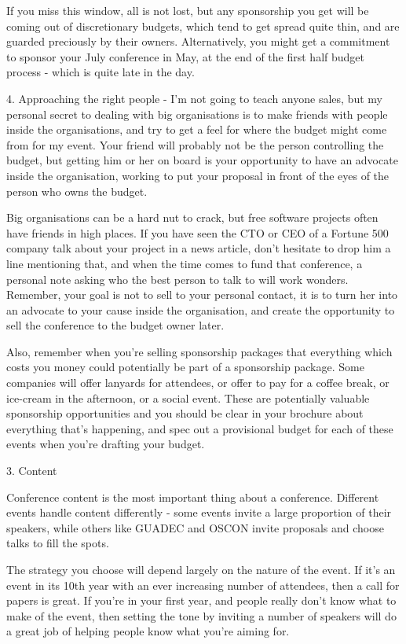               If you miss this window, all is not lost, but any sponsorship you get
will be coming out of discretionary budgets, which tend to get spread
quite thin, and are guarded preciously by their owners. Alternatively,
you might get a commitment to sponsor your July conference in May, at
the end of the first half budget process - which is quite late in the day.

               4. Approaching the right people - I'm not going to teach anyone sales,
but my personal secret to dealing with big organisations is to make
friends with people inside the organisations, and try to get a feel for
where the budget might come from for my event. Your friend will probably
not be the person controlling the budget, but getting him or her on
board is your opportunity to have an advocate inside the organisation,
working to put your proposal in front of the eyes of the person who owns
the budget.

               Big organisations can be a hard nut to crack, but free software
projects often have friends in high places. If you have seen the CTO or
CEO of a Fortune 500 company talk about your project in a news article,
don't hesitate to drop him a line mentioning that, and when the time
comes to fund that conference, a personal note asking who the best
person to talk to will work wonders. Remember, your goal is not to sell
to your personal contact, it is to turn her into an advocate to your
cause inside the organisation, and create the opportunity to sell the
conference to the budget owner later.

       Also, remember when you're selling sponsorship packages that everything
which costs you money could potentially be part of a sponsorship
package. Some companies will offer lanyards for attendees, or offer to
pay for a coffee break, or ice-cream in the afternoon, or a social
event. These are potentially valuable sponsorship opportunities and you
should be clear in your brochure about everything that's happening, and
spec out a provisional budget for each of these events when you're
drafting your budget.

3. Content

Conference content is the most important thing about a conference.
Different events handle content differently - some events invite a large
proportion of their speakers, while others like GUADEC and OSCON invite
proposals and choose talks to fill the spots.

The strategy you choose will depend largely on the nature of the event.
If it's an event in its 10th year with an ever increasing number of
attendees, then a call for papers is great. If you're in your first
year, and people really don't know what to make of the event, then
setting the tone by inviting a number of speakers will do a great job of
helping people know what you're aiming for.

